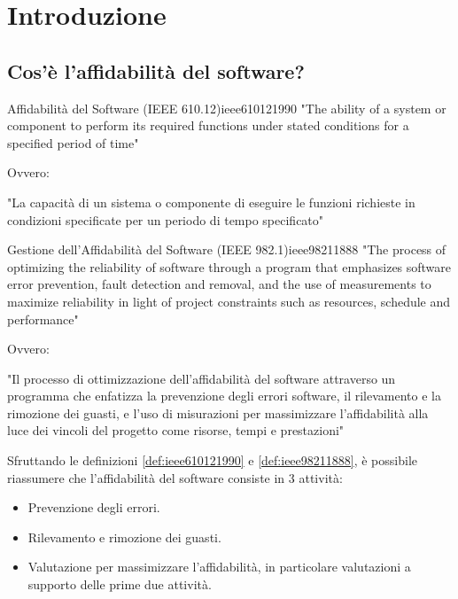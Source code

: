 \section{Introduzione}

\subsection{Cos'è l'affidabilità del software?}

\begin{definizione}{Affidabilità del Software (IEEE 610.12)}{ieee610121990}
"The ability of a system or component to perform its required functions
under stated conditions for a specified period of time"

Ovvero:

"La capacità di un sistema o componente di eseguire le funzioni richieste
in condizioni specificate per un periodo di tempo specificato"
\end{definizione}

\begin{definizione}{Gestione dell'Affidabilità del Software (IEEE 982.1)}{ieee98211888}
"The process of optimizing the reliability of software through a program that
emphasizes software error prevention, fault detection and removal, and the
use of measurements to maximize reliability in light of project constraints
such as resources, schedule and performance"

Ovvero:

"Il processo di ottimizzazione dell'affidabilità del software attraverso un
programma che enfatizza la prevenzione degli errori software, il rilevamento
e la rimozione dei guasti, e l'uso di misurazioni per massimizzare l'affidabilità
alla luce dei vincoli del progetto come risorse, tempi e prestazioni"

\end{definizione}

Sfruttando le definizioni \ref{def:ieee610121990} e \ref{def:ieee98211888},
è possibile riassumere che l'affidabilità del software consiste in 3 attività:
\begin{itemize}
    \item Prevenzione degli errori.
    \item Rilevamento e rimozione dei guasti.
    \item Valutazione per massimizzare l'affidabilità, in particolare valutazioni
    a supporto delle prime due attività.
\end{itemize}


